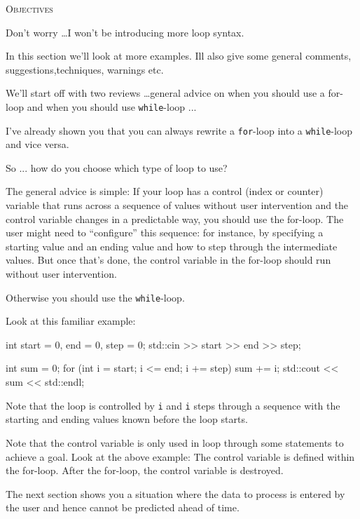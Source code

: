 \newpage{}

\textsc{Objectives}

Don't worry \ldots I won't be
introducing more loop syntax.

In this section we'll look at more examples.
Ill also give some general comments, suggestions,techniques, warnings etc.

We'll start off with two reviews \ldots general advice
on when you should use a for-loop and when you should use \texttt{while}-loop ...

\newpage{}

I've already shown you that you can always rewrite a \texttt{for}-loop into a \texttt{while}-loop and vice versa.

So ... how do you choose which type of loop to use?

The general advice is simple: If your loop has a control (index or
counter) variable that runs across a sequence of values without user
intervention and the control variable changes in a predictable way, you
should use the for-loop. The user might need to ``configure'' this
sequence: for instance, by specifying a starting value and an ending
value and how to step through the intermediate values. But once
that's done, the control variable in the for-loop should
run without user intervention.

Otherwise you should use the \texttt{while}-loop.

Look at this familiar example:
\begin{console}
int start = 0, end = 0, step = 0;
std::cin >> start >> end >> step;

int sum = 0;
for (int i = start; i <= end; i += step)
{   
    sum += i;
}
std::cout << sum << std::endl; 
\end{console}

Note that the loop is controlled by \texttt{i} and \texttt{i} steps through
a sequence with the starting and ending values known before the loop
starts.

Note that the control variable is only used in loop through some
statements to achieve a goal. Look at the above example: The control
variable is defined within the for-loop. After the for-loop, the control
variable is destroyed.

The next section shows you a situation where the data to process is
entered by the user and hence cannot be predicted ahead of time.

